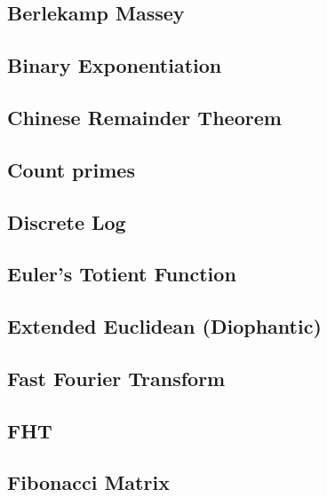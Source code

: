 \subsection{Berlekamp Massey}
\raggedbottom
\hrulefill
\subsection{Binary Exponentiation}
\raggedbottom
\hrulefill
\subsection{Chinese Remainder Theorem}
\raggedbottom
\hrulefill
\subsection{Count primes}
\raggedbottom
\hrulefill
\subsection{Discrete Log}
\raggedbottom
\hrulefill
\subsection{Euler's Totient Function}
\raggedbottom
\hrulefill
\subsection{Extended Euclidean (Diophantic)}
\raggedbottom
\hrulefill
\subsection{Fast Fourier Transform}
\raggedbottom
\hrulefill
\subsection{FHT}
\raggedbottom
\hrulefill
\subsection{Fibonacci Matrix}
\raggedbottom
\hrulefill
